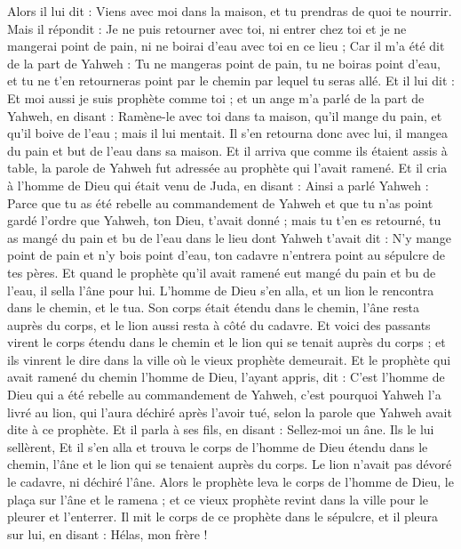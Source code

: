 \begin{multicols}{2}
Alors il lui dit : Viens avec moi dans la maison, et tu prendras de quoi te nourrir.
Mais il répondit : Je ne puis retourner avec toi, ni entrer chez toi et je ne mangerai point de pain, ni ne boirai d'eau avec toi en ce lieu ;
Car il m'a été dit de la part de Yahweh : Tu ne mangeras point de pain, tu ne boiras point d'eau, et tu ne t'en retourneras point par le chemin par lequel tu seras allé.
Et il lui dit : Et moi aussi je suis prophète comme toi ; et un ange m'a parlé de la part de Yahweh, en disant : Ramène-le avec toi dans ta maison, qu'il mange du pain, et qu'il boive de l'eau ; mais il lui mentait.
Il s'en retourna donc avec lui, il mangea du pain et but de l'eau dans sa maison.
Et il arriva que comme ils étaient assis à table, la parole de Yahweh fut adressée au prophète qui l'avait ramené.
Et il cria à l'homme de Dieu qui était venu de Juda, en disant : Ainsi a parlé Yahweh : Parce que tu as été rebelle au commandement de Yahweh et que tu n'as point gardé l’ordre que Yahweh, ton Dieu, t'avait donné ;
mais tu t'en es retourné, tu as mangé du pain et bu de l'eau dans le lieu dont Yahweh t'avait dit : N'y mange point de pain et n'y bois point d'eau, ton cadavre n'entrera point au sépulcre de tes pères.
Et quand le prophète qu'il avait ramené eut mangé du pain et bu de l’eau, il sella l’âne pour lui.
L’homme de Dieu s'en alla, et un lion le rencontra dans le chemin, et le tua. Son corps était étendu dans le chemin, l'âne resta auprès du corps, et le lion aussi resta à côté du cadavre.
Et voici des passants virent le corps étendu dans le chemin et le lion qui se tenait auprès du corps ; et ils vinrent le dire dans la ville où le vieux prophète demeurait.
Et le prophète qui avait ramené du chemin l'homme de Dieu, l'ayant appris, dit : C'est l'homme de Dieu qui a été rebelle au commandement de Yahweh, c'est pourquoi Yahweh l'a livré au lion, qui l'aura déchiré après l'avoir tué, selon la parole que Yahweh avait dite à ce prophète.
Et il parla à ses fils, en disant : Sellez-moi un âne. Ils le lui sellèrent,
Et il s'en alla et trouva le corps de l'homme de Dieu étendu dans le chemin, l'âne et le lion qui se tenaient auprès du corps. Le lion n'avait pas dévoré le cadavre, ni déchiré l'âne.
Alors le prophète leva le corps de l'homme de Dieu, le plaça sur l'âne et le ramena ; et ce vieux prophète revint dans la ville pour le pleurer et l'enterrer.
Il mit le corps de ce prophète dans le sépulcre, et il pleura sur lui, en disant : Hélas, mon frère !

\end{multicols}
